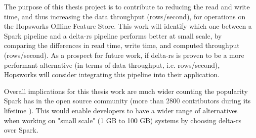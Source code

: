 The purpose of this thesis project is to contribute to reducing the read and write time, and thus increasing the data throughput (rows/second), for operations on the Hopsworks Offline Feature Store. This work will identify which one between a Spark pipeline and a delta-rs pipeline performs better at small scale, by comparing the differences in read time, write time, and computed throughput (rows/second). As a prospect for future work, if delta-rs is proven to be a more performant alternative (in terms of data throughput, i.e. rows/second), Hopsworks will consider integrating this pipeline into their application.

Overall implications for this thesis work are much wider counting the popularity Spark has in the open source community (more than 2800 contributors during its lifetime \cite{ApacheSparkOpen}). This would enable developers to have a wider range of alternatives when working on "small scale" (1 GB to 100 GB) systems by choosing delta-rs over Spark.